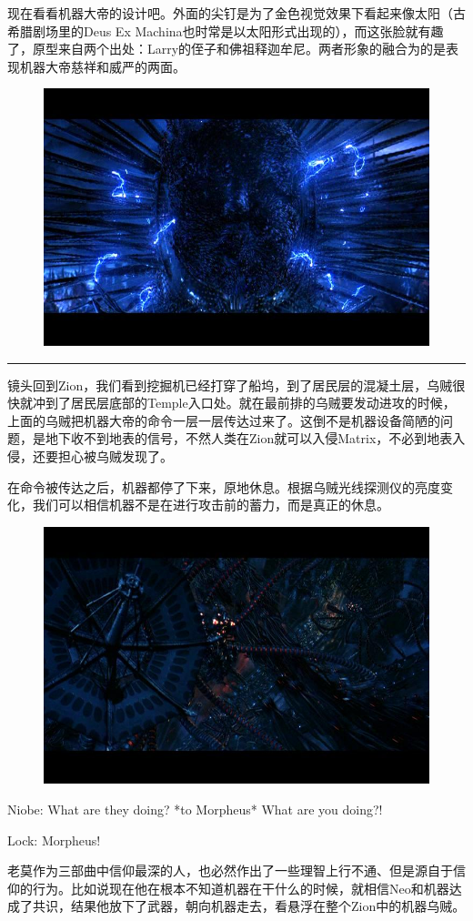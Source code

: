 \documentclass[UTF8]{ctexart}
\newcommand{\myparsep}{\noindent \rule[0.5ex]{\linewidth}{1pt}}
\newenvironment{myquote}{\color{green} \setlength{\leftskip}{6em} \setlength{\rightskip}{4em} \setlength{\parindent}{-2em}}{\par}
\begin{document}
现在看看机器大帝的设计吧。外面的尖钉是为了金色视觉效果下看起来像太阳（古希腊剧场里的Deus Ex Machina也时常是以太阳形式出现的），而这张脸就有趣了，原型来自两个出处：Larry的侄子和佛祖释迦牟尼。两者形象的融合为的是表现机器大帝慈祥和威严的两面。

\begin{figure}[htb]
\centering
\includegraphics[width=0.5\linewidth]{fig/99b590235f7eb645ac34de63.jpg}
\end{figure}

\myparsep

镜头回到Zion，我们看到挖掘机已经打穿了船坞，到了居民层的混凝土层，乌贼很快就冲到了居民层底部的Temple入口处。就在最前排的乌贼要发动进攻的时候，上面的乌贼把机器大帝的命令一层一层传达过来了。这倒不是机器设备简陋的问题，是地下收不到地表的信号，不然人类在Zion就可以入侵Matrix，不必到地表入侵，还要担心被乌贼发现了。

在命令被传达之后，机器都停了下来，原地休息。根据乌贼光线探测仪的亮度变化，我们可以相信机器不是在进行攻击前的蓄力，而是真正的休息。

\begin{figure}[htb]
\centering
\includegraphics[width=0.5\linewidth]{fig/c46dd8f948794458252df2d3.jpg}
\end{figure}

\begin{myquote}
Niobe: What are they doing? *to Morpheus* What are you doing?!

Lock: Morpheus!
\end{myquote}

老莫作为三部曲中信仰最深的人，也必然作出了一些理智上行不通、但是源自于信仰的行为。比如说现在他在根本不知道机器在干什么的时候，就相信Neo和机器达成了共识，结果他放下了武器，朝向机器走去，看悬浮在整个Zion中的机器乌贼。
\end{document}
